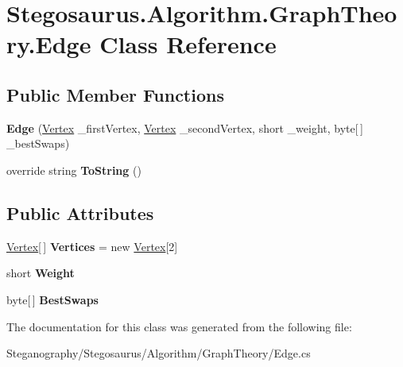 \hypertarget{class_stegosaurus_1_1_algorithm_1_1_graph_theory_1_1_edge}{}\section{Stegosaurus.\+Algorithm.\+Graph\+Theory.\+Edge Class Reference}
\label{class_stegosaurus_1_1_algorithm_1_1_graph_theory_1_1_edge}
\subsection*{Public Member Functions}
\begin{DoxyCompactItemize}
\item 
{\bfseries Edge} (\hyperlink{class_stegosaurus_1_1_algorithm_1_1_graph_theory_1_1_vertex}{Vertex} \+\_\+first\+Vertex, \hyperlink{class_stegosaurus_1_1_algorithm_1_1_graph_theory_1_1_vertex}{Vertex} \+\_\+second\+Vertex, short \+\_\+weight, byte\mbox{[}$\,$\mbox{]} \+\_\+best\+Swaps)\hypertarget{class_stegosaurus_1_1_algorithm_1_1_graph_theory_1_1_edge_afe2a496b57a45d06fb4d91e00262d002}{}\label{class_stegosaurus_1_1_algorithm_1_1_graph_theory_1_1_edge_afe2a496b57a45d06fb4d91e00262d002}

\item 
override string {\bfseries To\+String} ()\hypertarget{class_stegosaurus_1_1_algorithm_1_1_graph_theory_1_1_edge_ae68712118b1092b43dc3c00d46de7650}{}\label{class_stegosaurus_1_1_algorithm_1_1_graph_theory_1_1_edge_ae68712118b1092b43dc3c00d46de7650}

\end{DoxyCompactItemize}
\subsection*{Public Attributes}
\begin{DoxyCompactItemize}
\item 
\hyperlink{class_stegosaurus_1_1_algorithm_1_1_graph_theory_1_1_vertex}{Vertex}\mbox{[}$\,$\mbox{]} {\bfseries Vertices} = new \hyperlink{class_stegosaurus_1_1_algorithm_1_1_graph_theory_1_1_vertex}{Vertex}\mbox{[}2\mbox{]}\hypertarget{class_stegosaurus_1_1_algorithm_1_1_graph_theory_1_1_edge_a2c0f28a278e329a7d64f2a74b0c98f6c}{}\label{class_stegosaurus_1_1_algorithm_1_1_graph_theory_1_1_edge_a2c0f28a278e329a7d64f2a74b0c98f6c}

\item 
short {\bfseries Weight}\hypertarget{class_stegosaurus_1_1_algorithm_1_1_graph_theory_1_1_edge_afd137dab2e9ab9c32e66f72e14900b5f}{}\label{class_stegosaurus_1_1_algorithm_1_1_graph_theory_1_1_edge_afd137dab2e9ab9c32e66f72e14900b5f}

\item 
byte\mbox{[}$\,$\mbox{]} {\bfseries Best\+Swaps}\hypertarget{class_stegosaurus_1_1_algorithm_1_1_graph_theory_1_1_edge_a9abebfba06f3aac63eef2dbd57e06886}{}\label{class_stegosaurus_1_1_algorithm_1_1_graph_theory_1_1_edge_a9abebfba06f3aac63eef2dbd57e06886}

\end{DoxyCompactItemize}


The documentation for this class was generated from the following file\+:\begin{DoxyCompactItemize}
\item 
Steganography/\+Stegosaurus/\+Algorithm/\+Graph\+Theory/Edge.\+cs\end{DoxyCompactItemize}
